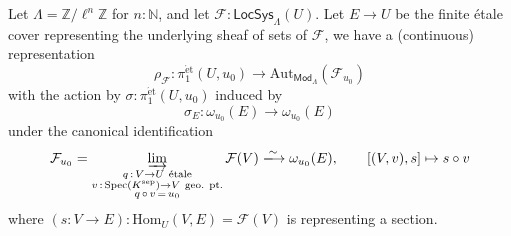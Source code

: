 \documentclass[11pt,letterpaper]{article}
\theoremstyle{numberfirstplain}
\numberwithin{equation}{theorem}
\theoremstyle{numberfirstupright}
\begin{document}
Let $\Lambda=\mathbb Z/\ell^n\mathbb Z$ for $n:\mathbb N$, and let $\mathcal F:\mathsf{LocSys}_{\Lambda}(U)$. Let $E\rightarrow U$ be the finite étale cover representing the underlying sheaf of sets of $\mathcal F$, we have a (continuous) representation
$$\rho_{\mathcal F}:\pi_1^{\mathrm{\acute{e}t}}(U,u_0)\rightarrow \mathrm{Aut}_{\mathsf{Mod}_{\Lambda}}(\mathcal F_{u_0})$$
with the action by $\sigma:\pi_1^{\mathrm{\acute{e}t}}(U,u_0)$ induced by 
$$\sigma_E:\omega_{u_0}(E)\rightarrow \omega_{u_0}(E)$$
under the canonical identification 
$$\mathcal F_{u_0}=\varinjlim_{\substack{q\,:\,V\to U\ \text{étale}\\v\,:\,\operatorname{Spec}(K^{\mathrm{sep}})\to V\ \text{geo. pt.}\\q\,\circ \,v\,=\,u_0}}\mathcal F(V)\xlongrightarrow{\sim}\omega_{u_0}(E),\qquad [(V,v),s]\mapsto s\circ v$$
where $(s:V\rightarrow E):\mathrm{Hom}_U(V,E)=\mathcal F(V)$ is representing a section. 
\end{document}
